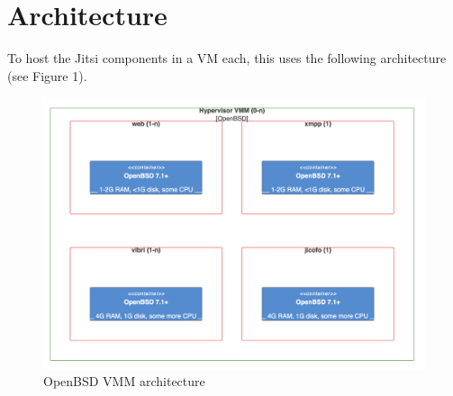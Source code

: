 \documentclass[10pt,conference]{IEEEtran}
\begin{document}
\section{Architecture}
To host the Jitsi components in a VM each, this uses the following architecture (see Figure 1).
\begin{figure}
    \centering
    \includegraphics[width=16cm]{img/arch-openbsd.png}
    \caption{\textsf{OpenBSD VMM architecture}}
\end{figure}
\end{document}
